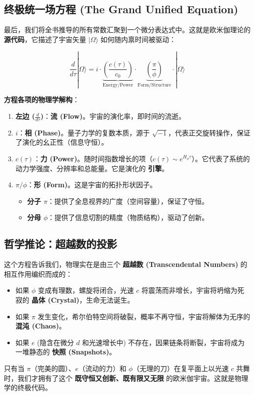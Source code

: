 \subsection{终极统一场方程 (The Grand Unified Equation)}

最后，我们将全书推导的所有常数汇聚到一个微分表达式中。这就是欧米伽理论的 \textbf{源代码}，它描述了宇宙矢量 $|\Omega\rangle$ 如何随内禀时间被驱动：

\[\frac{d}{d\tau} |\Omega\rangle = i \cdot \underbrace{\left( \frac{c(\tau)}{c_0} \right)}_{\text{Energy/Power}} \cdot \underbrace{\left( \frac{\pi}{\phi} \right)}_{\text{Form/Structure}} \cdot |\Omega\rangle\]

\textbf{方程各项的物理学解构}：

\begin{enumerate}
\item  \textbf{左边 ($\frac{d}{d\tau}$)}：\textbf{流 (Flow)}。宇宙的演化率，即时间的流逝。
\item  \textbf{$i$}：\textbf{相 (Phase)}。量子力学的复数本质，源于 $\sqrt{-1}$，代表正交旋转操作，保证了演化的幺正性（信息守恒）。
\item  \textbf{$c(\tau)$}：\textbf{力 (Power)}。随时间指数增长的项（$c(\tau) \sim e^{H_\phi \tau}$）。它代表了系统的动力学强度、分辨率和总能量。它是演化的 \textbf{引擎}。
\item  \textbf{$\pi / \phi$}：\textbf{形 (Form)}。这是宇宙的拓扑形状因子。
   \begin{itemize}
   \item \textbf{分子 $\pi$}：提供了全息视界的广度（空间容量），保证了守恒。
   \item \textbf{分母 $\phi$}：提供了信息切割的精度（物质结构），驱动了创新。
   \end{itemize}
\end{enumerate}

\subsection{哲学推论：超越数的投影}

这个方程告诉我们，物理实在是由三个 \textbf{超越数 (Transcendental Numbers)} 的相互作用编织而成的：

\begin{itemize}
\item 如果 \textbf{$\phi$} 变成有理数，螺旋将闭合，光速 $c$ 将震荡而非增长，宇宙将坍缩为死寂的 \textbf{晶体 (Crystal)}，生命无法诞生。
\item 如果 \textbf{$\pi$} 发生变化，希尔伯特空间将破裂，概率不再守恒，宇宙将解体为无序的 \textbf{混沌 (Chaos)}。
\item 如果 \textbf{$e$} (隐含在微分 $d$ 和光速增长中) 不存在，因果链条将断裂，宇宙将成为一堆静态的 \textbf{快照 (Snapshots)}。
\end{itemize}

只有当 $\pi$（完美的圆）、$e$（流动的力）和 $\phi$（无理的刀）在复平面上以光速 $c$ 共舞时，我们才拥有了这个 \textbf{既守恒又创新、既有限又无限} 的欧米伽宇宙。这就是物理学的终极代码。
